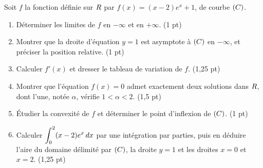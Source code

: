 \begin{commeaubac}
Soit $f$ la fonction définie sur $R$ par $f(x) = (x-2)e^{x} + 1$, de courbe
$(C)$.

\begin{enumerate}[label=\textbf{\arabic*.}, leftmargin=*, itemsep=0.25em]
  \item Déterminer les limites de $f$ en $-\infty$ et en $+\infty$.
        \hfill\textup{(1 pt)}
  \item Montrer que la droite d'équation $y = 1$ est asymptote à $(C)$ en
        $-\infty$, et préciser la position relative. \hfill\textup{(1 pt)}
  \item Calculer $f'(x)$ et dresser le tableau de variation de $f$.
        \hfill\textup{(1,25 pt)}
  \item Montrer que l'équation $f(x) = 0$ admet exactement deux solutions dans
        $R$, dont l'une, notée $\alpha$, vérifie $1 < \alpha < 2$.
        \hfill\textup{(1,5 pt)}
  \item Étudier la convexité de $f$ et déterminer le point d'inflexion de
        $(C)$. \hfill\textup{(1 pt)}
  \item Calculer $\displaystyle\int_{0}^{2}(x-2)e^{x}\,dx$ par une intégration
        par parties, puis en déduire l'aire du domaine délimité par $(C)$, la
        droite $y=1$ et les droites $x=0$ et $x=2$. \hfill\textup{(1,25 pt)}
\end{enumerate}
\end{commeaubac}

